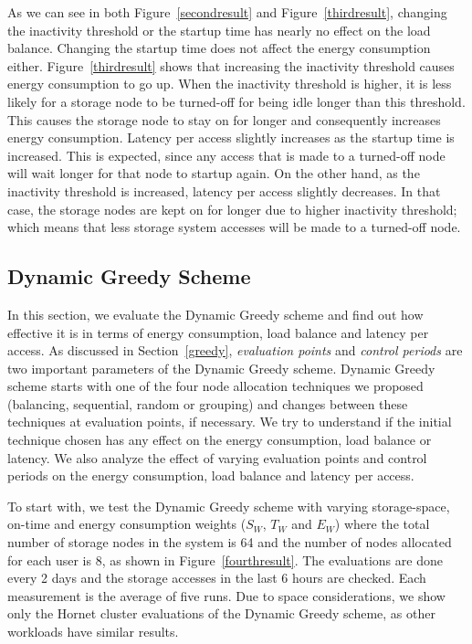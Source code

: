 As we can see in both Figure~\ref{secondresult} and Figure~\ref{thirdresult}, changing the inactivity threshold or the
startup time has nearly no effect on the load balance. Changing the startup time does not affect the energy consumption
either. Figure~\ref{thirdresult} shows that increasing the inactivity threshold causes energy consumption to go up. When
the inactivity threshold is higher, it is less likely for a storage node to be turned-off for being idle longer
than this threshold. This causes the storage node to stay on for longer and consequently increases energy consumption.
Latency per access slightly increases as the startup time is increased. This is expected, since any access that is made
to a turned-off node will wait longer for that node to startup again. On the other hand, as the inactivity threshold is
increased, latency per access slightly decreases. In that case, the storage nodes are kept on for longer due to higher
inactivity threshold; which means that less storage system accesses will be made to a turned-off node.

\subsection{Dynamic Greedy Scheme}
In this section, we evaluate the Dynamic Greedy scheme and find out how effective it is in terms of energy consumption, 
load balance and latency per access. As discussed in Section~\ref{greedy}, \textit{evaluation points} and
\textit{control periods} are two important parameters of the Dynamic Greedy scheme. Dynamic Greedy scheme starts with
one of the four node allocation techniques we proposed (balancing, sequential, random or grouping) and changes between
these techniques at evaluation points, if necessary. We try to understand if the initial technique chosen has any effect
on the energy consumption, load balance or latency. We also analyze the effect of varying evaluation points and
control periods on the energy consumption, load balance and latency per access.

To start with, we test the Dynamic Greedy scheme with varying storage-space, on-time and energy consumption weights
($S_W$, $T_W$ and $E_W$) where the total number of storage nodes in the system is 64 and the number of nodes allocated
for each user is 8, as shown in Figure~\ref{fourthresult}. The evaluations are done every 2 days and the storage
accesses in the last 6 hours are checked. Each measurement is the average of five runs. Due to space considerations, we
show only the Hornet cluster evaluations of the Dynamic Greedy scheme, as other workloads have similar results.

